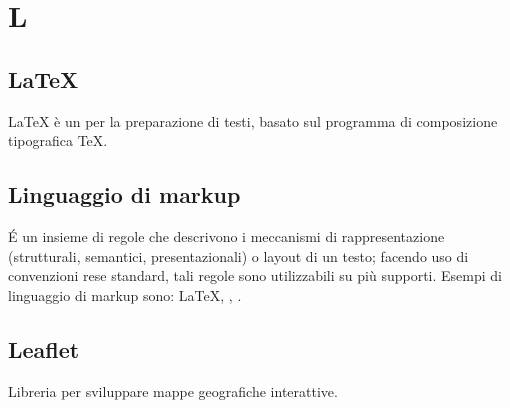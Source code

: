 \section*{L}
\markright{}
\subsection*{\LaTeX{}}
\LaTeX{} è un  per la preparazione di testi, basato sul programma di composizione tipografica \TeX{}.
\subsection*{Linguaggio di markup}
\'E un insieme di regole che descrivono i meccanismi di rappresentazione (strutturali, semantici, presentazionali) o layout di un testo; facendo uso di convenzioni rese standard, tali regole sono utilizzabili su più supporti. Esempi di linguaggio di markup sono: \LaTeX{}, , . 
\subsection*{Leaflet}
Libreria  per sviluppare mappe geografiche interattive.